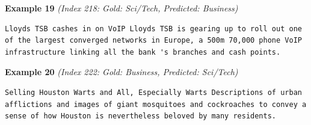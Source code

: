 \noindent
\textbf{Example 19} \quad \textit{(Index 218: Gold: Sci/Tech, Predicted: Business)}

\begin{Verbatim}[breaklines=true,breakanywhere=true,fontsize=\small]
Lloyds TSB cashes in on VoIP Lloyds TSB is gearing up to roll out one of the largest converged networks in Europe, a 500m 70,000 phone VoIP infrastructure linking all the bank 's branches and cash points.
\end{Verbatim}

\noindent
\textbf{Example 20} \quad \textit{(Index 222: Gold: Business, Predicted: Sci/Tech)}

\begin{Verbatim}[breaklines=true,breakanywhere=true,fontsize=\small]
Selling Houston Warts and All, Especially Warts Descriptions of urban afflictions and images of giant mosquitoes and cockroaches to convey a sense of how Houston is nevertheless beloved by many residents.
\end{Verbatim}
